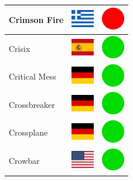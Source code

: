 \documentclass[12pt, a4paper, twoside]{report}
\begin{document}
\begin{center}
\begin{longtable}{|p{5cm}|p{2cm}|p{2cm}|}
 Crimson Fire                                               & \includegraphics[width=1cm]{../4x3/gr} &   \includegraphics[width=1cm]{../likes/n} \\ \hline
 Crisix                                                     & \includegraphics[width=1cm]{../4x3/es} &   \includegraphics[width=1cm]{../likes/y} \\ \hline
 Critical Mess                                              & \includegraphics[width=1cm]{../4x3/de} &   \includegraphics[width=1cm]{../likes/y} \\ \hline
 Crossbreaker                                               & \includegraphics[width=1cm]{../4x3/de} &   \includegraphics[width=1cm]{../likes/y} \\ \hline
 Crossplane                                                 & \includegraphics[width=1cm]{../4x3/de} &   \includegraphics[width=1cm]{../likes/y} \\ \hline
 Crowbar                                                    & \includegraphics[width=1cm]{../4x3/us} &   \includegraphics[width=1cm]{../likes/y} \\ \hline

\end{longtable}
\end{center}
\end{document}
